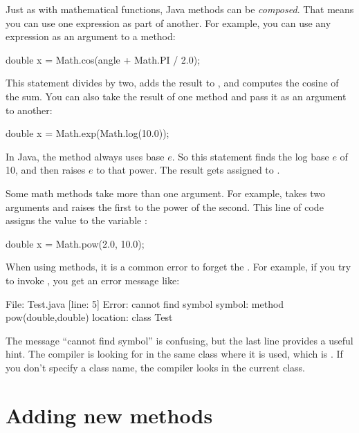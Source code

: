 
Just as with mathematical functions, Java methods can be {\em composed}.
That means you can use one expression as part of another.
For example, you can use any expression as an argument to a method:

\begin{code}
double x = Math.cos(angle + Math.PI / 2.0);
\end{code}

This statement divides  by two, adds the result to , and computes the cosine of the sum.
You can also take the result of one method and pass it as an argument to another:

\begin{code}
double x = Math.exp(Math.log(10.0));
\end{code}

In Java, the  method always uses base $e$.
So this statement finds the log base $e$ of 10, and then raises $e$ to that power.
The result gets assigned to .

Some math methods take more than one argument.
For example,  takes two arguments and raises the first to the power of the second.
This line of code assigns the value  to the variable :

\begin{code}
double x = Math.pow(2.0, 10.0);
\end{code}

When using  methods, it is a common error to forget the .
For example, if you try to invoke , you get an error message like:

\begin{stdout}
File: Test.java  [line: 5]
Error: cannot find symbol
  symbol:   method pow(double,double)
  location: class Test
\end{stdout}

The message ``cannot find symbol'' is confusing, but the last line provides a useful hint.
The compiler is looking for  in the same class where it is used, which is .
If you don't specify a class name, the compiler looks in the current class.


\section{Adding new methods}
\label{adding_methods}

